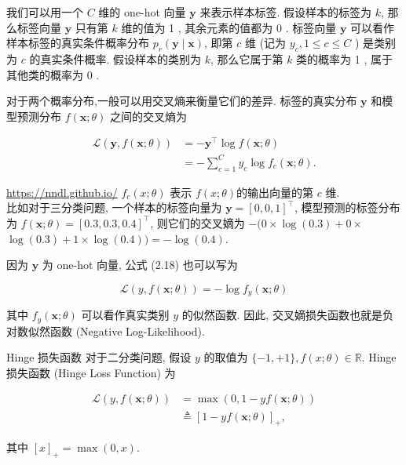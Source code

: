 \documentclass[10pt]{article}
\begin{document}
我们可以用一个 $C$ 维的 one-hot 向量 $\boldsymbol{y}$ 来表示样本标签. 假设样本的标签为 $k$, 那么标签向量 $\boldsymbol{y}$ 只有第 $k$ 维的值为 1 , 其余元素的值都为 0 . 标签向量 $\boldsymbol{y}$ 可以看作样本标签的真实条件概率分布 $p_{r}(\boldsymbol{y} \mid \boldsymbol{x})$, 即第 $c$ 维 (记为 $y_{c}, 1 \leq c \leq C$ ) 是类别为 $c$ 的真实条件概率. 假设样本的类别为 $k$, 那么它属于第 $k$ 类的概率为 1 , 属于其他类的概率为 0 .

对于两个概率分布,一般可以用交叉熵来衡量它们的差异. 标签的真实分布 $\boldsymbol{y}$ 和模型预测分布 $f(\boldsymbol{x} ; \theta)$ 之间的交叉熵为


\begin{align*}
\mathcal{L}(\boldsymbol{y}, f(\boldsymbol{x} ; \theta)) & =-\boldsymbol{y}^{\top} \log f(\boldsymbol{x} ; \theta)  \tag{2.17}\\
& =-\sum_{c=1}^{C} y_{c} \log f_{c}(\boldsymbol{x} ; \theta) . \tag{2.18}
\end{align*}


\href{https://nndl.github.io/}{https://nndl.github.io/} $f_{c}(x ; \theta)$ 表示 $f(x ; \theta)$的输出向量的第 $c$ 维.\\
比如对于三分类问题, 一个样本的标签向量为 $\boldsymbol{y}=[0,0,1]^{\top}$, 模型预测的标签分布为 $f(\boldsymbol{x} ; \theta)=[0.3,0.3,0.4]^{\top}$, 则它们的交叉嫡为 $-(0 \times \log (0.3)+0 \times$ $\log (0.3)+1 \times \log (0.4))=-\log (0.4)$.

因为 $\boldsymbol{y}$ 为 one-hot 向量, 公式 (2.18) 也可以写为


\begin{equation*}
\mathcal{L}(y, f(\boldsymbol{x} ; \theta))=-\log f_{y}(\boldsymbol{x} ; \theta) \tag{2.19}
\end{equation*}


其中 $f_{y}(\boldsymbol{x} ; \theta)$ 可以看作真实类别 $y$ 的似然函数. 因此, 交叉嫡损失函数也就是负对数似然函数 (Negative Log-Likelihood).

Hinge 损失函数 对于二分类问题, 假设 $y$ 的取值为 $\{-1,+1\}, f(x ; \theta) \in \mathbb{R}$. Hinge 损失函数 (Hinge Loss Function) 为


\begin{align*}
\mathcal{L}(y, f(\boldsymbol{x} ; \theta)) & =\max (0,1-y f(\boldsymbol{x} ; \theta))  \tag{2.20}\\
& \triangleq[1-y f(\boldsymbol{x} ; \theta)]_{+}, \tag{2.21}
\end{align*}


其中 $[x]_{+}=\max (0, x)$.
\end{document}

